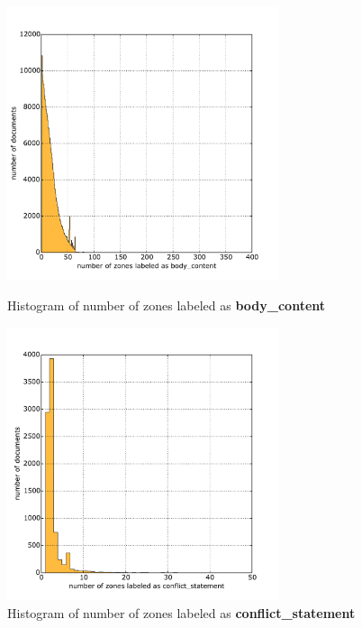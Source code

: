 \begin{figure}
\centering
\begin{minipage}[t!]{0.48\linewidth}
  \includegraphics[width=8cm]{plots/body_content_histogram}
  \caption{Histogram of number of zones labeled as \textbf{body\_content}}
  \label{fig:_histogram}
\end{minipage}
\quad
\begin{minipage}[t!]{0.48\linewidth}
  \includegraphics[width=8cm]{plots/conflict_statement_histogram}
  \caption{Histogram of number of zones labeled as \textbf{conflict\_statement}}
  \label{fig:_histogram}
\end{minipage}
\end{figure}

